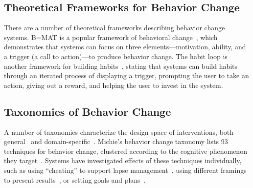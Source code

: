 \subsection{Theoretical Frameworks for Behavior Change}

There are a number of theoretical frameworks describing behavior change systems. B=MAT is a popular framework of behavioral change~\cite{fogg2002persuasive}, which demonstrates that systems can focus on three elements---motivation, ability, and a trigger (a call to action)---to produce behavior change. The habit loop is another framework for building habits~\cite{eyal2014hooked}, stating that systems can build habits through an iterated process of displaying a trigger, prompting the user to take an action, giving out a reward, and helping the user to invest in the system.

\subsection{Taxonomies of Behavior Change}

A number of taxonomies characterize the design space of interventions, both general~\cite{michie2013behavior, behaviourchangewheel, abraham2008taxonomy, dolanmindspace} and domain-specific~\cite{hardeman2000interventions, west2010behavior}. Michie's behavior change taxonomy lists 93 techniques for behavior change, clustered according to the cognitive phenomenon they target~\cite{michie2013behavior}. Systems have investigated effects of these techniques individually, such as using ``cheating'' to support lapse management~\cite{agapie2016staying}, using different framings to present results~\cite{kim2016timeaware}, or setting goals and plans~\cite{agapie2016plansourcing}.



